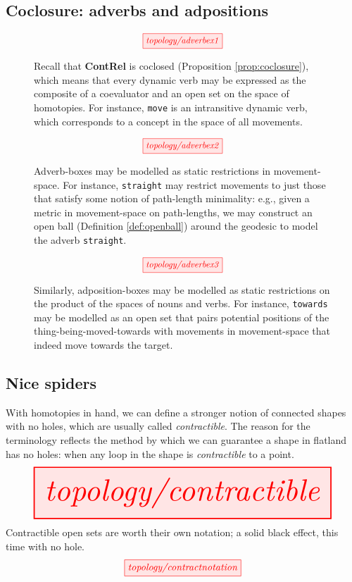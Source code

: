 \clearpage

\subsection{Coclosure: adverbs and adpositions}

\begin{figure}[h!]
\[\scalebox{0.9}{\tikzfig{topology/adverbex1}}\]
\caption{
Recall that \textbf{ContRel} is coclosed (Proposition \ref{prop:coclosure}), which means that every dynamic verb may be expressed as the composite of a coevaluator and an open set on the space of homotopies. For instance, \texttt{move} is an intransitive dynamic verb, which corresponds to a concept in the space of all movements.
}
\end{figure}

\begin{figure}[h!]
\[\scalebox{0.9}{\tikzfig{topology/adverbex2}}\]
\caption{
Adverb-boxes may be modelled as static restrictions in movement-space. For instance, \texttt{straight} may restrict movements to just those that satisfy some notion of path-length minimality: e.g., given a metric in movement-space on path-lengths, we may construct an open ball (Definition \ref{def:openball}) around the geodesic to model the adverb \texttt{straight}.
}
\end{figure}

\begin{figure}[h!]
\[\scalebox{0.9}{\tikzfig{topology/adverbex3}}\]
\caption{
Similarly, adposition-boxes may be modelled as static restrictions on the product of the spaces of nouns and verbs. For instance, \texttt{towards} may be modelled as an open set that pairs potential positions of the thing-being-moved-towards with movements in movement-space that indeed move towards the target.
}
\end{figure}

\clearpage

\subsection{Nice spiders}

\begin{example}[Contractibility]\label{defn:contractible}
With homotopies in hand, we can define a stronger notion of connected shapes with no holes, which are usually called \emph{contractible}. The reason for the terminology reflects the method by which we can guarantee a shape in flatland has no holes: when any loop in the shape is \emph{contractible} to a point.
\[\resizebox{\textwidth}{!}{\tikzfig{topology/contractible}}\]
Contractible open sets are worth their own notation; a solid black effect, this time with no hole.
\[\tikzfig{topology/contractnotation}\]
\end{example}

